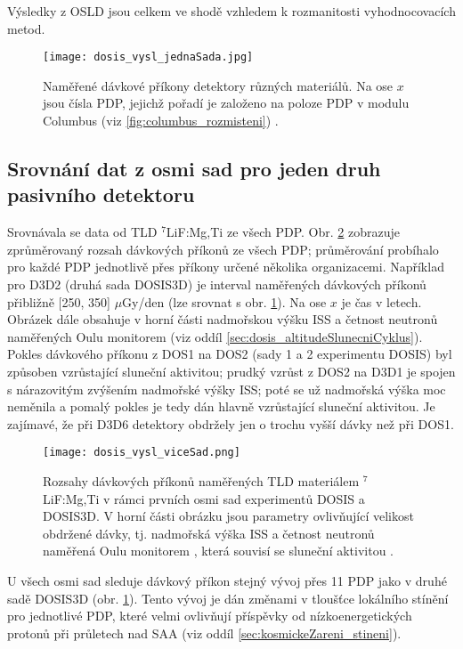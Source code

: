 Výsledky z OSLD jsou celkem ve shodě vzhledem k rozmanitosti vyhodnocovacích metod.
\begin{figure}[!t]
  \centering
  \texttt{[image: dosis\_vysl\_jednaSada.jpg]}
  \caption{Naměřené dávkové příkony detektory různých materiálů. Na ose $x$ jsou čísla PDP, jejichž pořadí je založeno na poloze PDP v modulu Columbus (viz \ref{fig:columbus_rozmisteni}) \cite{dosis}.}
  \label{fig:dosis_vysl_jednaSada}
\end{figure}
\subsection{Srovnání dat z osmi sad pro jeden druh pasivního detektoru}
Srovnávala se data od TLD $^7$LiF:Mg,Ti ze všech PDP. Obr. \ref{fig:dosis_vysl_viceSad} zobrazuje zprůměrovaný rozsah dávkových příkonů ze všech PDP; průměrování probíhalo pro každé PDP jednotlivě přes příkony určené několika organizacemi.
Například pro D3D2 (druhá sada DOSIS3D) je interval naměřených dávkových příkonů přibližně [250, 350] $\mu$Gy/den (lze srovnat s obr. \ref{fig:dosis_vysl_jednaSada}). Na ose $x$ je čas v letech. Obrázek dále obsahuje v horní části nadmořskou výšku ISS a četnost neutronů naměřených Oulu monitorem (viz oddíl \ref{sec:dosis_altitudeSlunecniCyklus}). Pokles dávkového příkonu z DOS1 na DOS2 (sady 1 a 2 experimentu DOSIS) byl způsoben vzrůstající sluneční aktivitou; prudký vzrůst z DOS2 na D3D1 je spojen s nárazovitým zvýšením nadmořské výšky ISS; poté se už nadmořská výška moc neměnila a pomalý pokles je tedy dán
hlavně vzrůstající sluneční aktivitou. Je zajímavé, že při D3D6 detektory obdržely jen o trochu vyšší dávky než při DOS1.
\begin{figure}[h]
  \centering
  \texttt{[image: dosis\_vysl\_viceSad.png]}
  \caption{Rozsahy dávkových příkonů naměřených TLD materiálem $^7$LiF:Mg,Ti v rámci prvních osmi sad experimentů DOSIS a DOSIS3D. V horní části obrázku jsou parametry ovlivňující velikost obdržené dávky, tj. nadmořská výška ISS a četnost neutronů naměřená Oulu monitorem \cite{dosis_oulu}, která souvisí se sluneční aktivitou \cite{dosis}.}
  \label{fig:dosis_vysl_viceSad}
\end{figure}

U všech osmi sad sleduje dávkový příkon stejný vývoj přes 11 PDP jako v druhé sadě DOSIS3D (obr. \ref{fig:dosis_vysl_jednaSada}). Tento vývoj je  dán změnami v tloušťce lokálního stínění pro jednotlivé PDP, které velmi ovlivňují příspěvky od nízkoenergetických protonů při průletech nad SAA (viz oddíl \ref{sec:kosmickeZareni_stineni}). 

